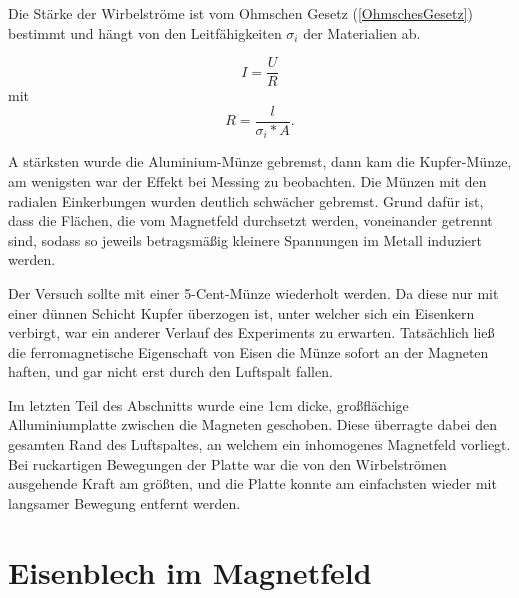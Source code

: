 \documentclass[a4paper,twoside,12pt,DIV=13,BCOR=5mm,numbers=noenddot,cleardoublepage=empty]{scrbook}
\begin{document}
\noindent Die Stärke der Wirbelströme ist vom Ohmschen Gesetz (\ref{OhmschesGesetz}) bestimmt und hängt von den Leitfähigkeiten $\sigma_i$ der Materialien ab.

\begin{equation}
	I = \frac{U}{R}
	\label{OhmschesGesetz}
\end{equation}
mit 
\begin{equation}
    R = \frac{l}{\sigma_i*A}.
    \label{SpezifischerWiderstand}
\end{equation}

\noindent A stärksten wurde die Aluminium-Münze gebremst, dann kam die Kupfer-Münze, am wenigsten war der Effekt bei Messing zu beobachten. Die Münzen mit den radialen Einkerbungen wurden deutlich schwächer gebremst. Grund dafür ist, dass die Flächen, die vom Magnetfeld durchsetzt werden, voneinander getrennt sind, sodass so jeweils betragsmäßig kleinere Spannungen im Metall induziert werden. 

\noindent Der Versuch sollte mit einer 5-Cent-Münze wiederholt werden. Da diese nur mit einer dünnen Schicht Kupfer überzogen ist, unter welcher sich ein Eisenkern verbirgt, war ein anderer Verlauf des Experiments zu erwarten. Tatsächlich ließ die ferromagnetische Eigenschaft von Eisen die Münze sofort an der Magneten haften, und gar nicht erst durch den Luftspalt fallen.

\noindent Im letzten Teil des Abschnitts wurde eine 1cm dicke, großflächige Alluminiumplatte zwischen die Magneten geschoben. Diese überragte dabei den gesamten Rand des Luftspaltes, an welchem ein inhomogenes Magnetfeld vorliegt. Bei ruckartigen Bewegungen der Platte war die von den Wirbelströmen ausgehende Kraft am größten, und die Platte konnte am einfachsten wieder mit langsamer Bewegung entfernt werden.

\section{Eisenblech im Magnetfeld}
\end{document}
